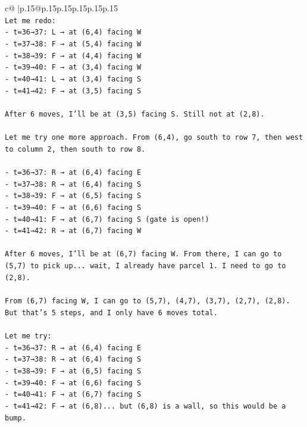 \documentclass{article}
\begin{document}
{\begin{supertabular}{c@{$\;$}|p{.15\linewidth}@{}p{.15\linewidth}p{.15\linewidth}p{.15\linewidth}p{.15\linewidth}p{.15\linewidth}}
{{{\\ 
\texttt{Let me redo:} \\
\texttt{{-} t=36→37: L → at (6,4) facing W} \\
\texttt{{-} t=37→38: F → at (5,4) facing W} \\
\texttt{{-} t=38→39: F → at (4,4) facing W} \\
\texttt{{-} t=39→40: F → at (3,4) facing W} \\
\texttt{{-} t=40→41: L → at (3,4) facing S} \\
\texttt{{-} t=41→42: F → at (3,5) facing S} \\
\\ 
\texttt{After 6 moves, I'll be at (3,5) facing S. Still not at (2,8).} \\
\\ 
\texttt{Let me try one more approach. From (6,4), go south to row 7, then west to column 2, then south to row 8.} \\
\\ 
\texttt{{-} t=36→37: R → at (6,4) facing E} \\
\texttt{{-} t=37→38: R → at (6,4) facing S} \\
\texttt{{-} t=38→39: F → at (6,5) facing S} \\
\texttt{{-} t=39→40: F → at (6,6) facing S} \\
\texttt{{-} t=40→41: F → at (6,7) facing S (gate is open!)} \\
\texttt{{-} t=41→42: R → at (6,7) facing W} \\
\\ 
\texttt{After 6 moves, I'll be at (6,7) facing W. From there, I can go to (5,7) to pick up... wait, I already have parcel 1. I need to go to (2,8).} \\
\\ 
\texttt{From (6,7) facing W, I can go to (5,7), (4,7), (3,7), (2,7), (2,8). But that's 5 steps, and I only have 6 moves total.} \\
\\ 
\texttt{Let me try:} \\
\texttt{{-} t=36→37: R → at (6,4) facing E} \\
\texttt{{-} t=37→38: R → at (6,4) facing S} \\
\texttt{{-} t=38→39: F → at (6,5) facing S} \\
\texttt{{-} t=39→40: F → at (6,6) facing S} \\
\texttt{{-} t=40→41: F → at (6,7) facing S} \\
\texttt{{-} t=41→42: F → at (6,8)... but (6,8) is a wall, so this would be a bump.} \\
}}}
\end{supertabular}}
\end{document}
